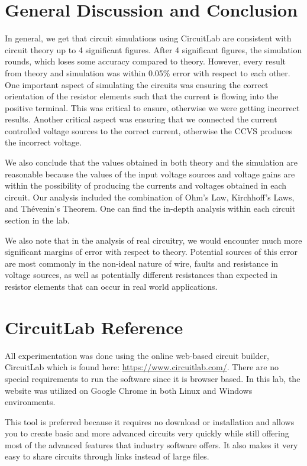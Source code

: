 \documentclass[12pt]{article}
\begin{document}
\section{General Discussion and Conclusion}
In general, we get that circuit simulations using CircuitLab are consistent with circuit theory up to 4 significant figures. After 4 significant figures, the simulation rounds, which loses some accuracy compared to theory. However, every result from theory and simulation was within 0.05\% error with respect to each other. One important aspect of simulating the circuits was ensuring the correct orientation of the resistor elements such that the current is flowing into the positive terminal. This was critical to ensure, otherwise we were getting incorrect results. Another critical aspect was ensuring that we connected the current controlled voltage sources to the correct current, otherwise the CCVS produces the incorrect voltage.

We also conclude that the values obtained in both theory and the simulation are reasonable because the values of the input voltage sources and voltage gains are within the possibility of producing the currents and voltages obtained in each circuit. Our analysis included the combination of Ohm's Law, Kirchhoff's Laws, and Thévenin's Theorem. One can find the in-depth analysis within each circuit section in the lab.

We also note that in the analysis of real circuitry, we would encounter much more significant margins of error with respect to theory. Potential sources of this error are most commonly in the non-ideal nature of wire, faults and resistance in voltage sources, as well as potentially different resistances than expected in resistor elements that can occur in real world applications.

\pagebreak

\section{CircuitLab Reference}
All experimentation was done using the online web-based circuit builder, CircuitLab which is found here: \url{https://www.circuitlab.com/}. There are no special requirements to run the software since it is browser based. In this lab, the website was utilized on Google Chrome in both Linux and Windows environments.

This tool is preferred because it requires no download or installation and allows you to create basic and more advanced circuits very quickly while still offering most of the advanced features that industry software offers. It also makes it very easy to share circuits through links instead of large files.
\end{document}
